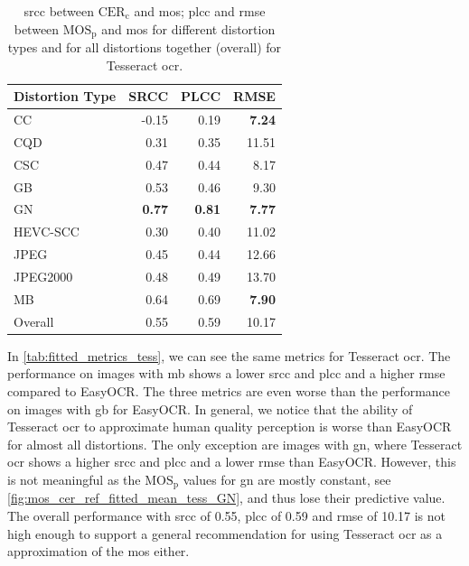 \begin{table}
    \centering
    \begin{tabular}{|l|rrr|}
        \hline
        Distortion Type & SRCC & PLCC & RMSE \\
        \hline
        \hline
        CC & -0.15 & 0.19 & \textbf{7.24} \\
        CQD & 0.31 & 0.35 & 11.51 \\
        CSC & 0.47 & 0.44 & 8.17 \\
        GB & 0.53 & 0.46 & 9.30 \\
        GN & \textbf{0.77} & \textbf{0.81} & \textbf{7.77} \\
        HEVC-SCC & 0.30 & 0.40 & 11.02 \\
        JPEG & 0.45 & 0.44 & 12.66 \\
        JPEG2000 & 0.48 & 0.49 & 13.70 \\
        MB & 0.64 & 0.69 & \textbf{7.90} \\
        \hline
        Overall & 0.55 & 0.59 & 10.17 \\
        \hline
    \end{tabular}
    \caption{\gls{srcc} between $\text{CER}_{\text{c}}$ and \gls{mos}; \gls{plcc} and \gls{rmse} between $\text{MOS}_{\text{p}}$ and \gls{mos} for different distortion types and for all distortions together (overall) for Tesseract \gls{ocr}.}
    \label{tab:fitted_metrics_tess}
\end{table}
In \autoref{tab:fitted_metrics_tess}, we can see the same metrics for Tesseract \gls{ocr}.
The performance on images with \gls{mb} shows a lower \gls{srcc} and \gls{plcc} and a higher \gls{rmse} compared to EasyOCR.
The three metrics are even worse than the performance on images with \gls{gb} for EasyOCR.
In general, we notice that the ability of Tesseract \gls{ocr} to approximate human quality perception is worse than EasyOCR for almost all distortions.
The only exception are images with \gls{gn}, where Tesseract \gls{ocr} shows a higher \gls{srcc} and \gls{plcc} and a lower \gls{rmse} than EasyOCR.
However, this is not meaningful as the $\text{MOS}_{\text{p}}$ values for \gls{gn} are mostly constant, see \autoref{fig:mos_cer_ref_fitted_mean_tess_GN}, and thus lose their predictive value.
The overall performance with \gls{srcc} of 0.55, \gls{plcc} of 0.59 and \gls{rmse} of 10.17 is not high enough to support a general recommendation for using Tesseract \gls{ocr} as a approximation of the \gls{mos} either.

